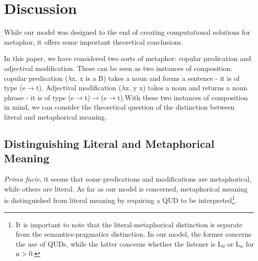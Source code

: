 \documentclass[10pt,letterpaper,twocolumn]{article}
\begin{document}




%


\section{Discussion} \label{discussion}

While our model was designed to the end of creating computational solutions for metaphor, it offers some important theoretical conclusions.

In this paper, we have considered two sorts of metaphor: copular predication and adjectival modification. These can be seen as two instances of composition: copular predication ($\lambda$x. x is a B) takes a noun and forms a sentence - it is of type (e$\to$t). Adjectival modification ($\lambda$x. y x) takes a noun and returns a noun phrase - it is of type (e$\to$t)$\to$(e$\to$t).With these two instances of composition in mind, we can consider the theoretical question of the distinction between literal and metaphorical meaning.


\subsection{Distinguishing Literal and Metaphorical Meaning} \label{litvsmet}

\emph{Prima facie}, it seems that some predications and modifications are metaphorical, while others are literal. As far as our model is concerned, metaphorical meaning is distinguished from literal meaning by requiring a QUD to be interpreted\footnote{It is important to note that the literal-metaphorical distinction is separate from the semantics-pragmatics distinction. In our model, the former concerns the use of QUDs, while the latter concerns whether the listener is L$_0$ or L$_n$ for n$>$0.}.
\end{document}
